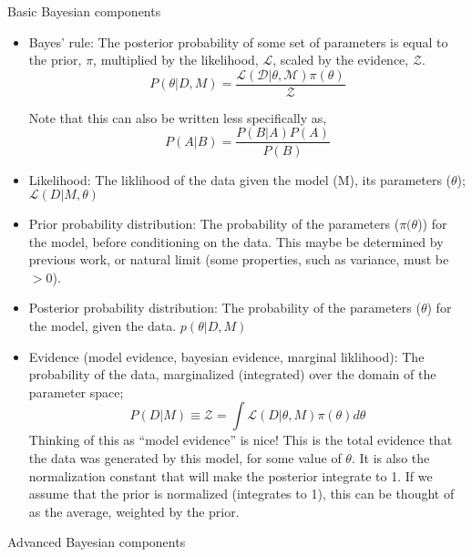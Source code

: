\documentclass{article}
\begin{document}
Basic Bayesian components
\begin{itemize}
    \item Bayes' rule: The posterior probability of some set of parameters is equal to the prior, $\pi$, multiplied by the likelihood, $\mathcal{L}$, scaled by the evidence, $\mathcal{Z}$.
        \begin{equation}
            P(\theta | D, M) = \frac{\mathcal{L(D | \theta, M)} \pi(\theta)}{\mathcal{Z}}
        \end{equation}

        Note that this can also be written less specifically as,
        \begin{equation}
            P(A | B) = \frac{P(B | A) P(A)}{P(B)}
        \end{equation}

    \item Likelihood: The liklihood of the data given the model (M), its parameters ($\theta$); $\mathcal{L}(D | M, \theta)$
    \item Prior probability distribution: The probability of the parameters ($\pi(\theta$)) for the model, before conditioning on the data. This maybe be determined by previous work, or natural limit (some properties, such as variance, must be $> 0$).
    \item Posterior probability distribution: The probability of the parameters ($\theta$) for the model, given the data. $p(\theta | D, M)$

    \item Evidence (model evidence, bayesian evidence, marginal liklihood): The probability of the data, marginalized (integrated) over the domain of the parameter space;
        \begin{equation}
            P(D | M) \equiv \mathcal{Z} = \int \mathcal{L}(D | \theta, M) \pi(\theta) d\theta
        \end{equation}
        Thinking of this as ``model evidence'' is nice! This is the total evidence that the data was generated by this model, for some value of $\theta$. It is also the normalization constant that will make the posterior integrate to 1.
        If we assume that the prior is normalized (integrates to 1), this can be thought of as the average, weighted by the prior.
\end{itemize}

Advanced Bayesian components
\end{document}
